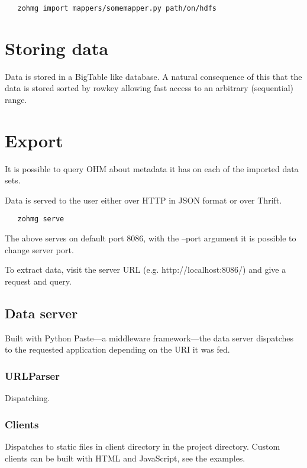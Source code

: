 \documentclass[a4paper,10pt]{book}
\begin{document}
\begin{verbatim}
   zohmg import mappers/somemapper.py path/on/hdfs
\end{verbatim}


\section{Storing data}

Data is stored in a BigTable like database. A natural consequence of this
that the data is stored sorted by rowkey allowing fast access to an
arbitrary (sequential) range.



\section{Export}

It is possible to query OHM about metadata it has on each of the imported
data sets.

Data is served to the user either over HTTP in JSON format or over Thrift.
\cite{thrift}

\begin{verbatim}
   zohmg serve
\end{verbatim}

\noindent The above serves on default port 8086, with the --port argument
it is possible to change server port.

To extract data, visit the server URL (e.g. http://localhost:8086/) and
give a request and query.


\subsection{Data server}

Built with Python Paste---a middleware framework---the data server dispatches
to the requested application depending on the URI it was fed.


\subsubsection{URLParser}

Dispatching.


\subsubsection{Clients}

Dispatches to static files in client directory in the project directory.
Custom clients can be built with HTML and JavaScript, see the examples.
\end{document}
